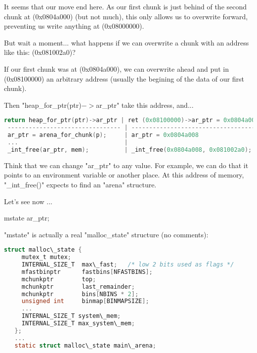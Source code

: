 \documentclass[12pt]{article}
\begin{document}
It seems that our move end here. As our first chunk is just behind of the
second chunk at (0x0804a000) (but not much), this only allows us to
overwrite forward, preventing us write anything at (0x08000000).
\newline


But wait a moment... what happens if we can overwrite a chunk with an
address like this: (0x081002a0)?
\newline


If our first chunk was at (0x0804a000), we can overwrite ahead and put in
(0x08100000) an arbitrary address (usually the begining of the data of our
first chunk).
\newline


Then "heap\_for\_ptr(ptr)$->$ar\_ptr" take this address, and...
\newline


\begin{lstlisting}[language=C]
 return heap_for_ptr(ptr)->ar_ptr | ret (0x08100000)->ar_ptr = 0x0804a008
 -------------------------------- | --------------------------------------
 ar_ptr = arena_for_chunk(p);     | ar_ptr = 0x0804a008
 ...                              |
 _int_free(ar_ptr, mem);          | _int_free(0x0804a008, 0x081002a0);
\end{lstlisting}


Think that we can change "ar\_ptr" to any value. For example, we can do
that it points to an environment variable or another place. At this
address of memory, "\_int\_free()" expects to find an "arena" structure.
\newline


Let's see now ...
\newline


    mstate ar\_ptr;
\newline


"mstate" is actually a real "malloc\_state" structure (no comments):
\begin{lstlisting}[language=C]
   struct malloc\_state {
     mutex_t mutex;
     INTERNAL_SIZE_T  max\_fast;   /* low 2 bits used as flags */
     mfastbinptr      fastbins[NFASTBINS];
     mchunkptr        top;
     mchunkptr        last_remainder;
     mchunkptr        bins[NBINS * 2];
     unsigned int     binmap[BINMAPSIZE];
     ...
     INTERNAL_SIZE_T system\_mem;
     INTERNAL_SIZE_T max_system\_mem;
   };
   ...
   static struct malloc\_state main\_arena;
\end{lstlisting}
\end{document}
